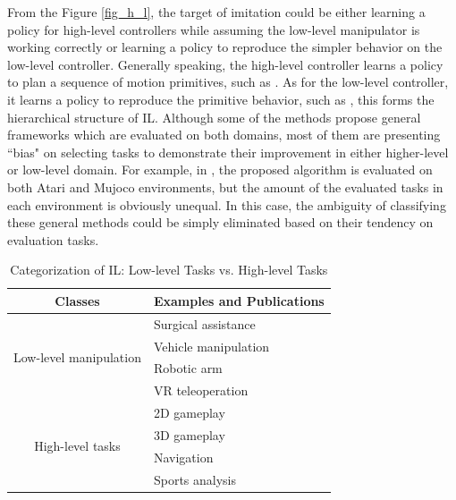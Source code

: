 \documentclass[acmsmall]{acmart}
\begin{document}
From the Figure \ref{fig_h_l}, the target of imitation could be either learning a policy for high-level controllers while assuming the low-level manipulator is working correctly or learning a policy to reproduce the simpler behavior on the low-level controller. Generally speaking, the high-level controller learns a policy to plan a sequence of motion primitives, such as \cite{osaOnlineTrajectoryPlanning2018}. As for the low-level controller, it learns a policy to reproduce the primitive behavior, such as \cite{sermanetTimeContrastiveNetworksSelfSupervised2018}, this forms the hierarchical structure of IL. Although some of the methods propose general frameworks which are evaluated on both domains, most of them are presenting ``bias" on selecting tasks to demonstrate their improvement in either higher-level or low-level domain. For example, in \cite{brownBetterthanDemonstratorImitationLearning2019}, the proposed algorithm is evaluated on both Atari and Mujoco environments, but the amount of the evaluated tasks in each environment is obviously unequal. In this case, the ambiguity of classifying these general methods could be simply eliminated based on their tendency on evaluation tasks.

\begin{table}[t]
\caption{Categorization of IL: Low-level Tasks vs. High-level Tasks}
\centering
\label{table_h_l}
\begin{tabular}{@{}cl@{}}
\toprule
Classes & Examples and Publications \\ \midrule
\multirow{4}{*}{Low-level manipulation}
&Surgical assistance\cite{osaOnlineTrajectoryPlanning2018,tanwani2020motion2vec}\\ \cmidrule(l){2-2} 
 & Vehicle manipulation\cite{zhouModelingCarFollowingBehaviors2020} \\ \cmidrule(l){2-2} 
 & Robotic arm\cite{sermanetTimeContrastiveNetworksSelfSupervised2018} \\ \cmidrule(l){2-2} 
 & VR teleoperation\cite{zhangDeepImitationLearning2018} \\ \midrule
\multirow{4}{*}{High-level tasks}&2D gameplay\cite{salimansLearningMontezumaRevenge2018} \\ \cmidrule(l){2-2} 
 & 3D gameplay\cite{arumugamDeepReinforcementLearning2019} \\ \cmidrule(l){2-2} 
 & Navigation\cite{husseinDeepImitationLearning2018} \\ \cmidrule(l){2-2} 
 & Sports analysis\cite{zhanGeneratingMultiAgentTrajectories2019} \\ \bottomrule
\end{tabular}
\end{table}
\end{document}
